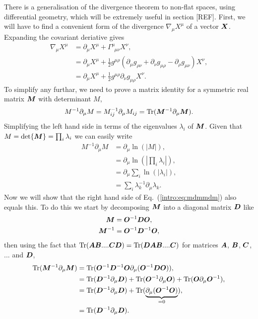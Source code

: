 There is a generalisation of the divergence theorem to non-flat spaces, using differential geometry, which will be extremely useful in section [REF]. First, we will have to find a convenient form of the divergence $\nabla_\mu X^\mu$ of a vector $\boldsymbol{X}$. Expanding the covariant deriative gives
\begin{align}
\nabla_\mu X^\mu &= \partial_\mu X^\mu + \Gamma^\mu_{\,\,\,\mu\nu}X^\nu , \\
&= \partial_\mu X^\mu + \frac{1}{2}g^{\mu\rho}\left(\partial_\mu g_{\rho\nu}+\partial_\nu g_{\mu\rho}-\partial_\rho g_{\mu\nu}\right)X^\nu , \\
&= \partial_\mu X^\mu + \frac{1}{2}g^{\mu\rho}\partial_\nu g_{\mu\rho}X^\nu. 
\end{align}
To simplify any furthar, we need to prove a matrix identity for a symmetric real matrix $\boldsymbol{M}$ with determinant $M$,
\begin{equation}\label{intro:eq:mdmmdm}
M^{-1} \partial_\mu M = M^{-1}_{ij} \partial_\mu M_{ij} = \mathrm{Tr}(\boldsymbol{M}^{-1} \partial_\mu \boldsymbol{M}).
\end{equation}
Simplifying the left hand side in terms of the eigenvalues $\lambda_i$ of $\boldsymbol{M}$. Given that $M=\det{\boldsymbol{M}}=\prod_i \lambda_i$ we can easily write
\begin{align}
M^{-1} \partial_\mu M &= \partial_\mu \ln(|M|) ,\\
&= \partial_\mu \ln\left(\left| \prod_i \lambda_i\right|\right) ,\\
&= \partial_\mu \sum_i \ln(\left|  \lambda_i\right|) ,\\
&= \sum_i \lambda_k^{-1}\partial_\mu \lambda_k. 
\end{align}
Now we will show that the right hand side of Eq.~(\ref{intro:eq:mdmmdm}) also equals this. To do this we start by decomposing $\boldsymbol{M}$ into a diagonal matrix $\boldsymbol{D}$ like
\begin{align}
\boldsymbol{M} &= \boldsymbol{O}^{-1} \boldsymbol{D} \boldsymbol{O},\\
\boldsymbol{M}^{-1} &= \boldsymbol{O}^{-1} \boldsymbol{D}^{-1} \boldsymbol{O},
\end{align}
then using the fact that $\mathrm{Tr}(\boldsymbol{A} \boldsymbol{B} .... \boldsymbol{C}\boldsymbol{D}) = \mathrm{Tr}(\boldsymbol{D}\boldsymbol{A} \boldsymbol{B} .... \boldsymbol{C})$ for matrices $\boldsymbol{A}$, $ \boldsymbol{B}$, $ \boldsymbol{C}$, $...$ and $\boldsymbol{D}$,
\begin{align}
\mathrm{Tr}(\boldsymbol{M}^{-1} \partial_\mu \boldsymbol{M}) &= \mathrm{Tr}(\boldsymbol{O}^{-1} \boldsymbol{D}^{-1} \boldsymbol{O} \partial_\mu (\boldsymbol{O}^{-1} \boldsymbol{D} \boldsymbol{O})) ,\\
&= \mathrm{Tr}(\boldsymbol{D}^{-1} \partial_\mu \boldsymbol{D}) + \mathrm{Tr}(\boldsymbol{O}^{-1} \partial_\mu \boldsymbol{O}) +\mathrm{Tr}(\boldsymbol{O} \partial_\mu \boldsymbol{O}^{-1}) , \\
&= \mathrm{Tr}(\boldsymbol{D}^{-1} \partial_\mu \boldsymbol{D}) + \mathrm{Tr}( \underbrace{\partial_\mu (\boldsymbol{O}^{-1}\boldsymbol{O})}_{=0}) , \\
&= \mathrm{Tr}(\boldsymbol{D}^{-1} \partial_\mu \boldsymbol{D}) .
\end{align}

